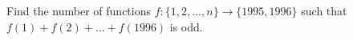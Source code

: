 Find the number of functions $f : \{1, 2, . . . , n\} \to \{1995, 1996\}$ such that $f(1) + f(2) + ... + f(1996)$ is odd.